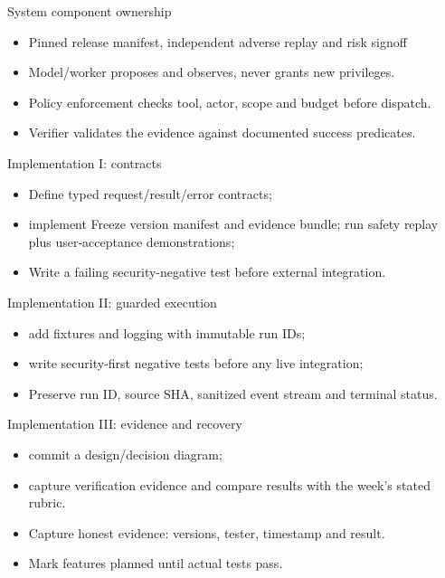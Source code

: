 \documentclass[aspectratio=169,10pt]{beamer}
\begin{document}
\begin{frame}{System component ownership}
\small
\begin{itemize}
\item Pinned release manifest, independent adverse replay and risk signoff
\item Model/worker proposes and observes, never grants new privileges.
\item Policy enforcement checks tool, actor, scope and budget before dispatch.
\item Verifier validates the evidence against documented success predicates.
\end{itemize}

\end{frame}

\begin{frame}{Implementation I: contracts}
\small
\begin{itemize}
\item Define typed request/result/error contracts;
\item implement Freeze version manifest and evidence bundle; run safety replay plus user-acceptance demonstrations;
\item Write a failing security-negative test before external integration.
\end{itemize}

\end{frame}

\begin{frame}{Implementation II: guarded execution}
\small
\begin{itemize}
\item add fixtures and logging with immutable run IDs;
\item write security-first negative tests before any live integration;
\item Preserve run ID, source SHA, sanitized event stream and terminal status.
\end{itemize}

\end{frame}

\begin{frame}{Implementation III: evidence and recovery}
\small
\begin{itemize}
\item commit a design/decision diagram;
\item capture verification evidence and compare results with the week's stated rubric.
\item Capture honest evidence: versions, tester, timestamp and result.
\item Mark features planned until actual tests pass.
\end{itemize}

\end{frame}
\end{document}
